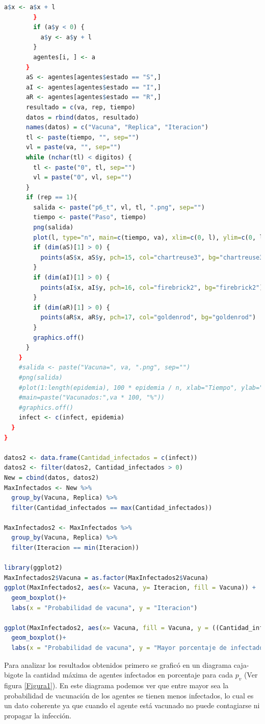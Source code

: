 \documentclass{article}
\begin{document}
\begin{lstlisting}[language=R, caption= Código objetivo de la práctica para obtener la cantidad máxima de infectados por replica y la iteración en la que ocurre.]
          a$x <- a$x + l
        }
        if (a$y < 0) {
          a$y <- a$y + l
        }
        agentes[i, ] <- a
      }
      aS <- agentes[agentes$estado == "S",]
      aI <- agentes[agentes$estado == "I",]
      aR <- agentes[agentes$estado == "R",]
      resultado = c(va, rep, tiempo)
      datos = rbind(datos, resultado)
      names(datos) = c("Vacuna", "Replica", "Iteracion")
      tl <- paste(tiempo, "", sep="")
      vl = paste(va, "", sep="")
      while (nchar(tl) < digitos) {
        tl <- paste("0", tl, sep="")
        vl = paste("0", vl, sep="")
      }
      if (rep == 1){
        salida <- paste("p6_t", vl, tl, ".png", sep="")
        tiempo <- paste("Paso", tiempo)
        png(salida)
        plot(l, type="n", main=c(tiempo, va), xlim=c(0, l), ylim=c(0, l), xlab="x", ylab="y")
        if (dim(aS)[1] > 0) {
          points(aS$x, aS$y, pch=15, col="chartreuse3", bg="chartreuse3")
        }
        if (dim(aI)[1] > 0) {
          points(aI$x, aI$y, pch=16, col="firebrick2", bg="firebrick2")
        }
        if (dim(aR)[1] > 0) {
          points(aR$x, aR$y, pch=17, col="goldenrod", bg="goldenrod")
        }
        graphics.off()
      }
    }
    #salida <- paste("Vacuna=", va, ".png", sep="")
    #png(salida)
    #plot(1:length(epidemia), 100 * epidemia / n, xlab="Tiempo", ylab="Porcentaje de infectados",
    #main=paste("Vacunados:",va * 100, "%"))
    #graphics.off()
    infect <- c(infect, epidemia)
  }
}

datos2 <- data.frame(Cantidad_infectados = c(infect))
datos2 <- filter(datos2, Cantidad_infectados > 0)
New = cbind(datos, datos2)
MaxInfectados <- New %>% 
  group_by(Vacuna, Replica) %>%
  filter(Cantidad_infectados == max(Cantidad_infectados))

MaxInfectados2 <- MaxInfectados %>% 
  group_by(Vacuna, Replica) %>%
  filter(Iteracion == min(Iteracion))

library(ggplot2)
MaxInfectados2$Vacuna = as.factor(MaxInfectados2$Vacuna)
ggplot(MaxInfectados2, aes(x= Vacuna, y= Iteracion, fill = Vacuna)) + 
  geom_boxplot()+
  labs(x = "Probabilidad de vacuna", y = "Iteracion")

ggplot(MaxInfectados2, aes(x= Vacuna, fill = Vacuna, y = ((Cantidad_infectados/50) * 100))) + 
  geom_boxplot()+
  labs(x = "Probabilidad de vacuna", y = "Mayor porcentaje de infectados")
\end{lstlisting}

Para analizar los resultados obtenidos primero se graficó en un diagrama caja-bigote la cantidad máxima de agentes infectados en porcentaje para cada $p_v$ (Ver figura \ref{Figura1}). En este diagrama podemos ver que entre mayor sea la probabilidad de vacunación de los agentes se tienen menos infectados, lo cual es un dato coherente ya que cuando el agente está vacunado no puede contagiarse ni propagar la infección. 
\bigskip
\end{document}
